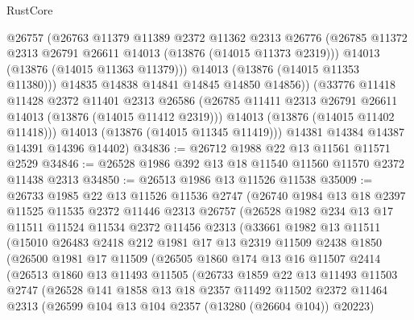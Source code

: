 \begin{lexlean}{RustCore}
\begin{coremodule}
              @26757
              (@26763
                @11379
                @11389
                @2372
                @11362
                @2313
                @26776
                (@26785 @11372 @2313 @26791 @26611 @14013 (@13876 (@14015 @11373 @2319)))
                @14013
                (@13876 (@14015 @11363 @11379)))
              @14013
              (@13876 (@14015 @11353 @11380)))
            @14835
            @14838
            @14841
            @14845
            @14850
            @14856))
        (@33776
          @11418
          @11428
          @2372
          @11401
          @2313
          @26586
          (@26785 @11411 @2313 @26791 @26611 @14013 (@13876 (@14015 @11412 @2319)))
          @14013
          (@13876 (@14015 @11402 @11418)))
        @14013
        (@13876 (@14015 @11345 @11419)))
      @14381
      @14384
      @14387
      @14391
      @14396
      @14402)
@34836 := @26712 @1988 @22 @13 @11561 @11571 @2529
@34846 := @26528 @1986 @392 @13 @18 @11540 @11560 @11570 @2372 @11438 @2313
@34850 := @26513 @1986 @13 @11526 @11538
@35009 := @26733
    @1985
    @22
    @13
    @11526
    @11536
    @2747
    (@26740
      @1984
      @13
      @18
      @2397
      @11525
      @11535
      @2372
      @11446
      @2313
      @26757
      (@26528
        @1982
        @234
        @13
        @17
        @11511
        @11524
        @11534
        @2372
        @11456
        @2313
        (@33661
          @1982
          @13
          @11511
          (@15010
            @26483
            @2418
            @212
            @1981
            @17
            @13
            @2319
            @11509
            @2438
            @1850
            (@26500
              @1981
              @17
              @11509
              (@26505
                @1860
                @174
                @13
                @16
                @11507
                @2414
                (@26513
                  @1860
                  @13
                  @11493
                  @11505
                  (@26733
                    @1859
                    @22
                    @13
                    @11493
                    @11503
                    @2747
                    (@26528
                      @141
                      @1858
                      @13
                      @18
                      @2357
                      @11492
                      @11502
                      @2372
                      @11464
                      @2313
                      (@26599 @104 @13 @104 @2357 (@13280 (@26604 @104)) @20223)

\end{coremodule}
\end{lexlean}

